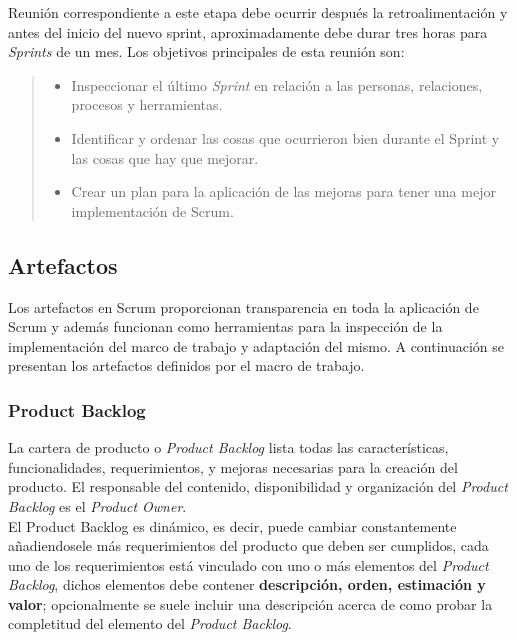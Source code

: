  \noindent Reunión correspondiente a este etapa debe ocurrir después la retroalimentación y antes del inicio del
 nuevo sprint, aproximadamente debe durar tres horas para {\it Sprints} de un mes. Los objetivos principales de
 esta reunión son:

    \begin{quote}
    \begin{itemize}
    \item Inspeccionar el último {\it Sprint} en relación a las personas, relaciones, procesos y herramientas.
    \item Identificar y ordenar las cosas que ocurrieron bien durante el Sprint y las cosas que hay que mejorar.
    \item Crear un plan para la aplicación de las mejoras para tener una mejor implementación de Scrum.
    \end{itemize}
    \end{quote}

\subsection{Artefactos}

 Los artefactos en Scrum proporcionan transparencia en toda la aplicación de Scrum
 y además funcionan como herramientas para la inspección de la implementación del
 marco de trabajo y adaptación del mismo. A continuación se presentan los artefactos
 definidos por el macro de trabajo.

 

\subsubsection{Product Backlog}

 La cartera de producto o {\it Product Backlog} lista todas las características, funcionalidades, requerimientos,
 y mejoras necesarias para la creación del producto. El responsable del contenido, disponibilidad y organización
 del {\it Product Backlog} es el {\it Product Owner}.\\

 \noindent El Product Backlog es dinámico, es decir, puede cambiar constantemente añadiendosele más requerimientos
 del producto que deben ser cumplidos, cada uno de los requerimientos está vinculado con uno o más elementos del
 {\it Product Backlog}, dichos elementos debe contener {\bf descripción, orden, estimación y valor}; opcionalmente
 se suele incluir una descripción acerca de como probar la completitud del elemento del {\it Product Backlog}.

